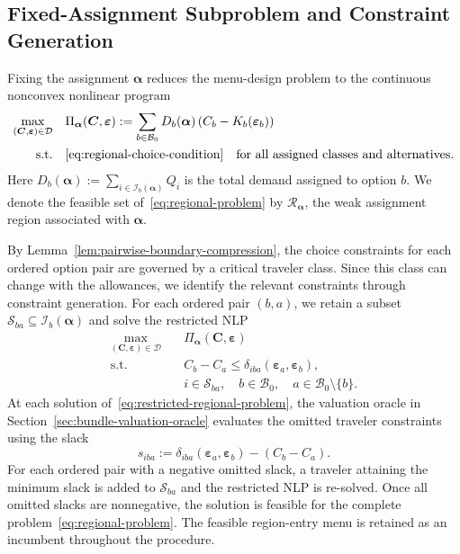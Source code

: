 \documentclass{article}
\begin{document}
\subsection{Fixed-Assignment Subproblem and Constraint Generation}
\label{sec:assignment-regions}

Fixing the assignment $\bm\alpha$ reduces the menu-design problem to
the continuous nonconvex nonlinear program
\begin{equation}
    \begin{aligned}
        \max_{(\bm C,\bm\varepsilon)\in\mathcal D}
        \quad &
        \Pi_{\bm\alpha}(\bm C,\bm\varepsilon)
        :=
        \sum_{b\in\mathcal B_0}
        D_b(\bm\alpha)
        \left(C_b-K_b(\bm\varepsilon_b)\right)
        \\
        \text{s.t.}\quad &
        \eqref{eq:regional-choice-condition}
        \quad \text{for all assigned classes and alternatives}.
    \end{aligned}
    \label{eq:regional-problem}
\end{equation}
Here $D_b(\bm\alpha):=\sum_{i\in\mathcal I_b(\bm\alpha)}Q_i$
is the total demand assigned to option $b$. We denote the feasible set
of~\eqref{eq:regional-problem} by $\mathcal R_{\bm\alpha}$, the weak
assignment region associated with $\bm\alpha$.

By Lemma~\ref{lem:pairwise-boundary-compression}, the choice constraints
for each ordered option pair are governed by a critical traveler class.
Since this class can change with the allowances, we identify the relevant
constraints through constraint generation. For each ordered pair
$(b,a)$, we retain a subset
$\mathcal S_{ba}\subseteq\mathcal I_b(\bm\alpha)$ and solve the
restricted NLP
\begin{equation}
    \begin{aligned}
        \max_{(\bm C,\bm\varepsilon)\in\mathcal D}
        \quad &
        \Pi_{\bm\alpha}(\bm C,\bm\varepsilon)
        \\
        \text{s.t.}\quad &
        C_b-C_a
        \leq
        \delta_{iba}(\bm\varepsilon_a,\bm\varepsilon_b),
        \\
        & i\in\mathcal S_{ba},\quad
        b\in\mathcal B_0,\quad
        a\in\mathcal B_0\setminus\{b\}.
    \end{aligned}
    \label{eq:restricted-regional-problem}
\end{equation}
At each solution of~\eqref{eq:restricted-regional-problem}, the valuation
oracle in Section~\ref{sec:bundle-valuation-oracle} evaluates the omitted
traveler constraints using the slack
\begin{equation}
    s_{iba}
    :=
    \delta_{iba}(\bm\varepsilon_a,\bm\varepsilon_b)
    -
    (C_b-C_a).
    \label{eq:traveler-separation}
\end{equation}
For each ordered pair with a negative omitted slack, a traveler attaining
the minimum slack is added to $\mathcal S_{ba}$ and the restricted NLP is
re-solved. Once all omitted slacks are nonnegative, the solution is
feasible for the complete problem~\eqref{eq:regional-problem}.
The feasible region-entry menu is retained as an incumbent throughout
the procedure.
\end{document}
